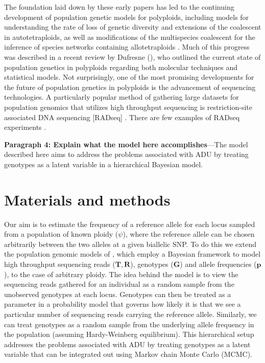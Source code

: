 \documentclass[11pt,english,letterpaper,oneside]{article}
\begin{document}
The foundation laid down by these early papers has led to the continuing development of population genetic models for polyploids, including models for understanding the rate of loss of genetic diversity and extensions of the coalescent in autotetraploids, as well as modifications of the multispecies coalescent for the inference of species networks containing allotetraploids \citep{moody1993autopolyploids,arnold2012autotetraploidCoal,jones2013allopolyploid}. Much of this progress was described in a recent review by Dufresne \etal{} (\citeyear{dufresne2014polyPopGen}), who outlined the current state of population genetics in polyploids regarding both molecular techniques and statistical models. Not surprisingly, one of the most promising developments for the future of population genetics in polyploids is the advancement of sequencing technologies. A particularly popular method of gathering large datasets for population genomics that utilizes high throughput sequencing is restriction-site associated DNA sequencing [RADseq] \citep{miller2007gbs,baird2008radTags,puritz2014demystifyingRAD}. There are few examples of RADseq experiments \citep[but see][]{ogden2013sturgeonRADseq,wang2013birchRADseq,logan-young2015polyploidSNP}. 
\medskip

\textbf{Paragraph 4: Explain what the model here accomplishes}---The model described here aims to address the problems associated with ADU by treating genotypes as a latent variable in a hierarchical Bayesian model. 
\medskip

\section*{Materials and methods}                  %

\noindent Our aim is to estimate the frequency of a reference allele for each locus sampled from a population of known ploidy ($\psi$), where the reference allele can be chosen arbitrarily between the two alleles at a given biallelic SNP. To do this we extend the population genomic models of \cite{buerkle2013popModels}, which employ a Bayesian framework to model high throughput sequencing reads ($\bm{T},\bm{R}$), genotypes ($\bm{G}$) and allele frequencies ($\bm{p}$), to the case of arbitrary ploidy. The idea behind the model is to view the sequencing reads gathered for an individual as a random sample from the unobserved genotypes at each locus. Genotypes can then be treated as a parameter in a probability model that governs how likely it is that we see a particular number of sequencing reads carrying the reference allele. Similarly, we can treat genotypes as a random sample from the underlying allele frequency in the population (assuming Hardy-Weinberg equilibrium). This hierarchical setup addresses the problems associated with ADU by treating genotypes as a latent variable that can be integrated out using Markov chain Monte Carlo (MCMC).
\medskip
\end{document}
